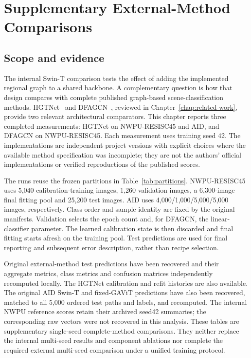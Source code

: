 \chapter{Supplementary External-Method Comparisons}
\label{chap:external-comparisons}

\section{Scope and evidence}

The internal Swin-T comparison tests the effect of adding the implemented
regional graph to a shared backbone. A complementary question is how that
design compares with complete published graph-based scene-classification
methods. HGTNet~\cite{li2024hgtnet} and DFAGCN~\cite{xu2022dfagcn}, reviewed
in Chapter~\ref{chap:related-work}, provide two relevant architectural
comparators. This chapter reports three completed measurements: HGTNet on
NWPU-RESISC45 and AID, and DFAGCN on NWPU-RESISC45. Each measurement uses
training seed 42. The implementations are independent project versions with
explicit choices where the available method specification was incomplete;
they are not the authors' official implementations or verified reproductions
of the published scores.

The runs reuse the frozen partitions in Table~\ref{tab:partitions}.
NWPU-RESISC45 uses 5,040 calibration-training images, 1,260 validation images,
a 6,300-image final fitting pool and 25,200 test images. AID uses
4,000/1,000/5,000/5,000 images, respectively. Class order and sample identity
are fixed by the original manifests. Validation selects the epoch count
and, for DFAGCN, the linear-classifier parameter. The learned calibration
state is then discarded and final fitting starts afresh on the training
pool. Test predictions are used for final reporting and subsequent error
description, rather than recipe selection.

Original external-method test predictions have been recovered and their
aggregate metrics, class metrics and confusion matrices independently
recomputed locally. The HGTNet calibration and refit histories are also
available. The original AID Swin-T and fixed-GAViT predictions have also
been recovered, matched to all 5,000 ordered test paths and labels, and
recomputed. The internal NWPU reference scores retain their archived
seed42 summaries; the corresponding raw vectors were not recovered in
this analysis. These tables are supplementary single-seed
complete-method comparisons. They neither replace the internal multi-seed
results and component ablations nor complete the required external
multi-seed comparison under a unified training protocol.

